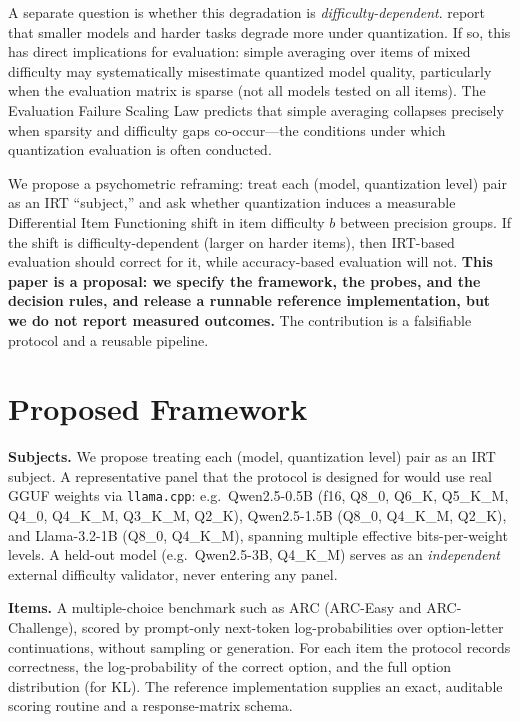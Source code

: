 \documentclass[11pt]{article}
\begin{document}
A separate question is whether this degradation is \emph{difficulty-dependent}. \citet{liu2025quant} report that smaller models and harder tasks degrade more under quantization. If so, this has direct implications for evaluation: simple averaging over items of mixed difficulty may systematically misestimate quantized model quality, particularly when the evaluation matrix is sparse (not all models tested on all items). The Evaluation Failure Scaling Law \citep{kang2026efsl} predicts that simple averaging collapses precisely when sparsity and difficulty gaps co-occur---the conditions under which quantization evaluation is often conducted.

We propose a psychometric reframing: treat each (model, quantization level) pair as an IRT ``subject,'' and ask whether quantization induces a measurable Differential Item Functioning \citep{holland1993} shift in item difficulty $b$ between precision groups. If the shift is difficulty-dependent (larger on harder items), then IRT-based evaluation should correct for it, while accuracy-based evaluation will not. \textbf{This paper is a proposal: we specify the framework, the probes, and the decision rules, and release a runnable reference implementation, but we do not report measured outcomes.} The contribution is a falsifiable protocol and a reusable pipeline.

\section{Proposed Framework}
\textbf{Subjects.} We propose treating each (model, quantization level) pair as an IRT subject. A representative panel that the protocol is designed for would use real GGUF weights via \texttt{llama.cpp}: e.g.\ Qwen2.5-0.5B (f16, Q8\_0, Q6\_K, Q5\_K\_M, Q4\_0, Q4\_K\_M, Q3\_K\_M, Q2\_K), Qwen2.5-1.5B (Q8\_0, Q4\_K\_M, Q2\_K), and Llama-3.2-1B (Q8\_0, Q4\_K\_M), spanning multiple effective bits-per-weight levels. A held-out model (e.g.\ Qwen2.5-3B, Q4\_K\_M) serves as an \emph{independent} external difficulty validator, never entering any panel.

\textbf{Items.} A multiple-choice benchmark such as ARC \citep{clark2018} (ARC-Easy and ARC-Challenge), scored by prompt-only next-token log-probabilities over option-letter continuations, without sampling or generation. For each item the protocol records correctness, the log-probability of the correct option, and the full option distribution (for KL). The reference implementation supplies an exact, auditable scoring routine and a response-matrix schema.
\end{document}

